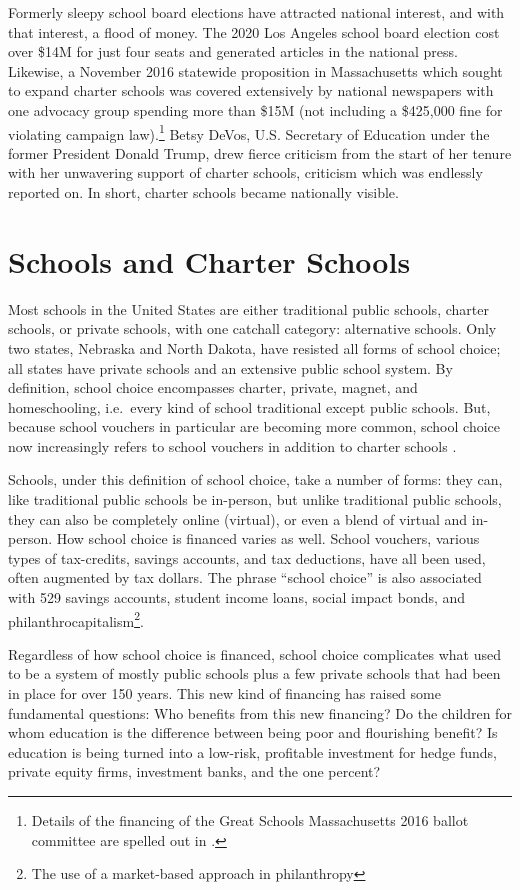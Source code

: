 Formerly sleepy school board elections have attracted national interest, and with that interest, a flood of money. The 2020 Los Angeles school board election cost over \$14M for just four seats and generated articles in the national press. Likewise, a November 2016 statewide proposition in Massachusetts which sought to expand charter schools was covered extensively by national newspapers with one advocacy group spending more than \$15M (not including a \$425,000 fine for violating campaign law).\footnote{Details of the financing of the Great Schools Massachusetts 2016 ballot committee are spelled out in \textcite{Cunningham2021}.} Betsy DeVos, U.S. Secretary of Education under the former President Donald Trump, drew fierce criticism from the start of her tenure with her unwavering support of charter schools, criticism which was endlessly reported on. In short, charter schools became nationally visible. 

\section{Schools and Charter Schools}\indent

Most schools in the United States are either traditional public schools, charter schools, or private schools, with one catchall category: alternative schools.  Only two states, Nebraska and North Dakota, have resisted all forms of school choice; all states have private schools and an extensive public school system. By definition, school choice encompasses charter, private, magnet, and homeschooling, i.e.~every kind of school traditional except public schools. But, because school vouchers in particular are becoming more common, school choice now increasingly refers to school vouchers in addition to charter schools \parencite{Enlow2022}.

Schools, under this definition of school choice, take a number of forms: they can, like traditional public schools be in-person, but unlike traditional public schools, they can also be completely online (virtual), or even a blend of virtual and in-person. How school choice is financed varies as well. School vouchers, various types of tax-credits, savings accounts, and tax deductions, have all been used, often augmented by tax dollars. The phrase ``school choice'' is also associated with 529 savings accounts, student income loans, social impact bonds, and philanthrocapitalism\footnote{The use of a market-based approach in philanthropy}.

Regardless of how school choice is financed, school choice complicates what used to be a system of mostly public schools plus a few private schools that had been in place for over 150 years. This new kind of financing has raised some fundamental questions: Who benefits from this new financing? Do the children for whom education is the difference between being poor and flourishing benefit? Is education is being turned into a low-risk, profitable investment for hedge funds, private equity firms, investment banks, and the one percent?

